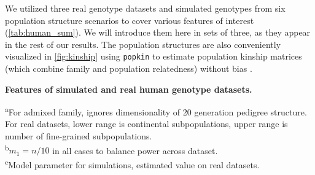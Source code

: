 \documentclass[11pt]{article}
\begin{document}
We utilized three real genotype datasets and simulated genotypes from six population structure scenarios to cover various features of interest (\cref{tab:human_sum}).
We will introduce them here in sets of three, as they appear in the rest of our results.
The population structures are also conveniently visualized in \cref{fig:kinship} using \texttt{popkin} to estimate population kinship matrices (which combine family and population relatedness) without bias \citep{ochoa_estimating_2021}.

\begin{table}[hb!]
  \centering
  \footnotesize
  \caption{
    \textbf{Features of simulated and real human genotype datasets.}
  }
  \label{tab:human_sum}
  \begin{flushleft} 
    \textsuperscript{a}For admixed family, ignores dimensionality of 20 generation pedigree structure.
    For real datasets, lower range is continental subpopulations, upper range is number of fine-grained subpopulations.\\
    \textsuperscript{b}$m_1 = n / 10$ in all cases to balance power across dataset.\\
    \textsuperscript{c}Model parameter for simulations, estimated value on real datasets.
  \end{flushleft}
\end{table}
\end{document}
